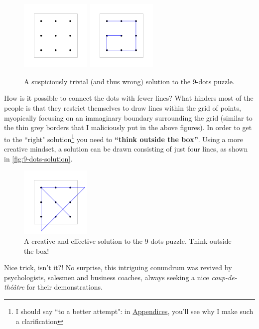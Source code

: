 \documentclass[11pt]{article}
\begin{document}
\begin{figure}[H]
\centering
\includegraphics[width=0.3\textwidth]{images/9-dots-grid.png}
\includegraphics[width=0.3\textwidth]{images/9-dots-wrong-solution.png}
\caption{A suspiciously trivial (and thus wrong) solution to the 9-dots puzzle.}
\label{fig:9-dots-wrong}
\end{figure}
How is it possible to connect the dots with fewer lines?
What hinders most of the people is that they restrict themselves to draw lines within the grid of points, myopically focusing on an immaginary boundary surrounding the grid (similar to the thin grey borders that I maliciously put in the above figures). In order to get to the ``right" solution\footnote{I should say ``to a better attempt": in \hyperlink{appendices}{Appendices}, you'll see why I make such a clarification} you need to \textbf{``think outside the box''}. Using a more creative mindset, a solution can be drawn consisting of just four lines, as shown in \autoref{fig:9-dots-solution}.
\begin{figure}[H]
\centering
\includegraphics[width=0.3\textwidth]{images/9-dots-solution.png}
\caption{A creative and effective solution to the 9-dots puzzle. Think outside the box!}
\label{fig:9-dots-solution}
\end{figure}
Nice trick, isn't it?! No surprise, this intriguing conundrum was revived by psychologists, salesmen and business coaches, always seeking a nice \emph{coup-de-théâtre} for their demonstrations.
\end{document}
